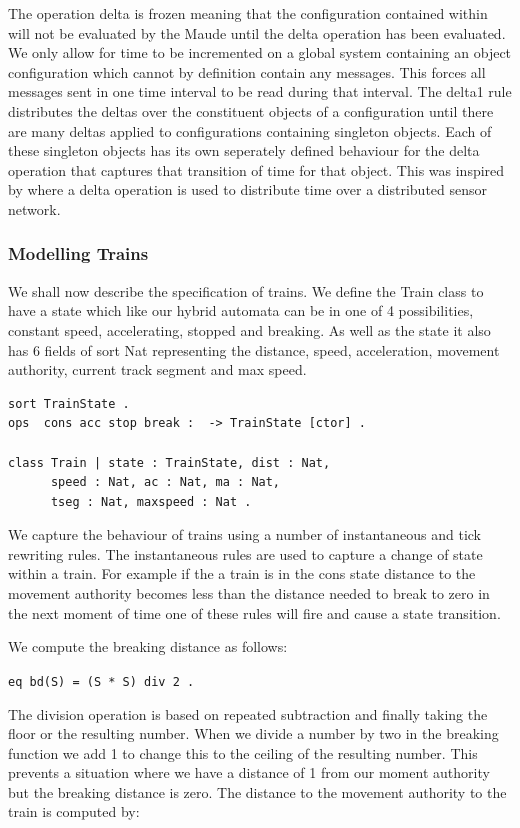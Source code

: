 The operation delta is frozen meaning that the configuration contained within will not be evaluated by the Maude until the delta operation has been evaluated. We only allow for time to be incremented on a global system containing an object configuration which cannot by definition contain any messages. This forces all messages sent in one time interval to be read during that interval. The delta1 rule distributes the deltas over the constituent objects of a configuration until there are many deltas applied to configurations containing singleton objects. Each of these singleton objects has its own seperately defined behaviour for the delta operation that captures that transition of time for that object. This was inspired by  \cite{} where a delta operation is used to distribute time over a distributed sensor network. 

\subsubsection*{Modelling Trains}
We shall now describe the specification of trains. We define the Train class to have a state which like our hybrid automata can be in one of 4 possibilities, constant speed, accelerating, stopped and breaking. As well as the state it also has 6 fields of sort Nat representing the distance, speed, acceleration, movement authority,  current track segment and max speed.

\begin{lstlisting}
sort TrainState .
ops  cons acc stop break :  -> TrainState [ctor] .

class Train | state : TrainState, dist : Nat, 
      speed : Nat, ac : Nat, ma : Nat, 
      tseg : Nat, maxspeed : Nat .
\end{lstlisting}

We capture the behaviour of trains using a number of instantaneous and tick rewriting rules. The instantaneous rules are used to capture a change of state within a train. For example if the a train is in the cons state distance to the movement authority becomes less than the distance needed to break to zero in the next moment of time one of these rules will fire and cause a state transition. 

We compute the breaking distance as follows: 
\begin{center}\texttt{eq bd(S) = (S * S) div 2 .}\end{center}


The division operation is based on repeated subtraction and finally taking the floor or the resulting number. When we divide a number by two in the breaking function we add 1 to change this to the ceiling of the resulting number. This prevents a situation where we have a distance of 1 from our moment authority but the breaking distance is zero.
The distance to the movement authority to the train is computed by:
\begin{center}
\texttt{} \\
\texttt{}
\end{center}

